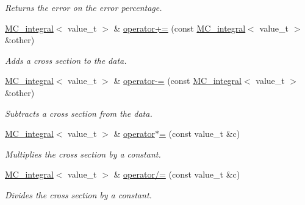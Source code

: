 \begin{DoxyCompactItemize}
\begin{DoxyCompactList}\small\item\em Returns the error on the error percentage. \end{DoxyCompactList}\item 
\hypertarget{a00368_adbf522c34eefb8c3f778ace5f43f651d}{}\hyperlink{a00368}{M\+C\+\_\+integral}$<$ value\+\_\+t $>$ \& \hyperlink{a00368_adbf522c34eefb8c3f778ace5f43f651d}{operator+=} (const \hyperlink{a00368}{M\+C\+\_\+integral}$<$ value\+\_\+t $>$ \&other)\label{a00368_adbf522c34eefb8c3f778ace5f43f651d}

\begin{DoxyCompactList}\small\item\em Adds a cross section to the data. \end{DoxyCompactList}\item 
\hypertarget{a00368_aca3cdcca491ffd8942c387c2031ee75c}{}\hyperlink{a00368}{M\+C\+\_\+integral}$<$ value\+\_\+t $>$ \& \hyperlink{a00368_aca3cdcca491ffd8942c387c2031ee75c}{operator-\/=} (const \hyperlink{a00368}{M\+C\+\_\+integral}$<$ value\+\_\+t $>$ \&other)\label{a00368_aca3cdcca491ffd8942c387c2031ee75c}

\begin{DoxyCompactList}\small\item\em Subtracts a cross section from the data. \end{DoxyCompactList}\item 
\hypertarget{a00368_a5ae480f831de6aea00087f513dea9421}{}\hyperlink{a00368}{M\+C\+\_\+integral}$<$ value\+\_\+t $>$ \& \hyperlink{a00368_a5ae480f831de6aea00087f513dea9421}{operator$\ast$=} (const value\+\_\+t \&c)\label{a00368_a5ae480f831de6aea00087f513dea9421}

\begin{DoxyCompactList}\small\item\em Multiplies the cross section by a constant. \end{DoxyCompactList}\item 
\hypertarget{a00368_a8829847aa62867c5edd0cf769938c712}{}\hyperlink{a00368}{M\+C\+\_\+integral}$<$ value\+\_\+t $>$ \& \hyperlink{a00368_a8829847aa62867c5edd0cf769938c712}{operator/=} (const value\+\_\+t \&c)\label{a00368_a8829847aa62867c5edd0cf769938c712}

\begin{DoxyCompactList}\small\item\em Divides the cross section by a constant. \end{DoxyCompactList}\end{DoxyCompactItemize}
